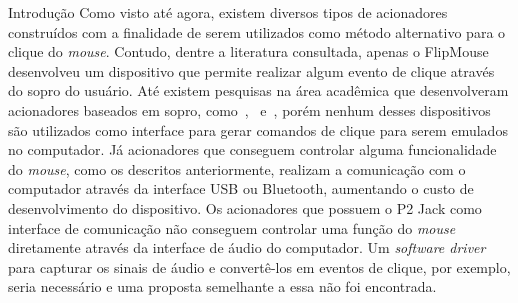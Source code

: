 \begin{chapter}{Introdução}
\vspace{-0.15cm}
Como visto até agora, existem diversos tipos de acionadores construídos com a
finalidade de serem utilizados como método alternativo para o clique do
\textit{mouse}.  Contudo, dentre a literatura consultada, apenas o FlipMouse
desenvolveu um dispositivo que permite realizar algum evento de clique através
do sopro do usuário. Até existem pesquisas na área acadêmica que desenvolveram
acionadores baseados em sopro, como~\cite{Thaller13},~\cite{Mougharbel13}
e~\cite{Filho14}, porém nenhum desses dispositivos são utilizados como interface
para gerar comandos de clique para serem emulados no computador. Já acionadores
que conseguem controlar alguma funcionalidade do \textit{mouse}, 
como os descritos anteriormente,  realizam a comunicação com o computador 
através da interface USB ou Bluetooth, aumentando o custo de desenvolvimento do
dispositivo. Os acionadores que possuem o P2 Jack como interface de comunicação 
não conseguem controlar uma função do \textit{mouse} diretamente através da
interface de áudio do computador. Um \textit{software driver} para capturar os
sinais de áudio e convertê-los em eventos de clique, por exemplo, seria
necessário e uma proposta semelhante a essa não foi encontrada.    




\end{chapter}
